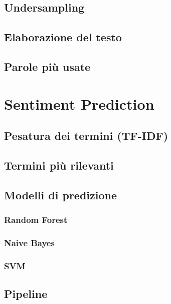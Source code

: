\documentclass[hidelinks, 12pt]{article}
\begin{document}
\subsection{Undersampling}

\subsection{Elaborazione del testo}

\subsection{Parole più usate}



\clearpage



\section{Sentiment Prediction}

\subsection{Pesatura dei termini (TF-IDF)}

\subsection{Termini più rilevanti}

\subsection{Modelli di predizione}

\subsubsection{Random Forest}
\subsubsection{Naive Bayes}
\subsubsection{SVM}

\subsection{Pipeline}
\end{document}
